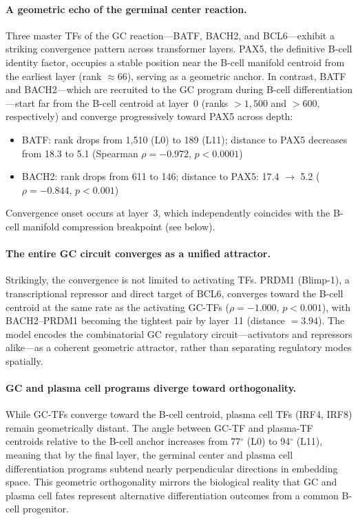 \documentclass[10pt,twocolumn]{article}
\begin{document}
\paragraph{A geometric echo of the germinal center reaction.}
Three master TFs of the GC reaction---BATF, BACH2, and BCL6---exhibit a striking convergence pattern across transformer layers.
PAX5, the definitive B-cell identity factor, occupies a stable position near the B-cell manifold centroid from the earliest layer (rank $\approx 66$), serving as a geometric anchor.
In contrast, BATF and BACH2---which are recruited to the GC program during B-cell differentiation---start far from the B-cell centroid at layer~0 (ranks $> 1{,}500$ and $> 600$, respectively) and converge progressively toward PAX5 across depth:
\begin{itemize}
  \item BATF: rank drops from 1{,}510 (L0) to 189 (L11); distance to PAX5 decreases from 18.3 to 5.1 (Spearman $\rho = -0.972$, $p < 0.0001$)
  \item BACH2: rank drops from 611 to 146; distance to PAX5: 17.4 $\to$ 5.2 ($\rho = -0.844$, $p < 0.001$)
\end{itemize}
Convergence onset occurs at layer~3, which independently coincides with the B-cell manifold compression breakpoint (see below).

\paragraph{The entire GC circuit converges as a unified attractor.}
Strikingly, the convergence is not limited to activating TFs.
PRDM1 (Blimp-1), a transcriptional repressor and direct target of BCL6, converges toward the B-cell centroid at the same rate as the activating GC-TFs ($\rho = -1.000$, $p < 0.001$), with BACH2--PRDM1 becoming the tightest pair by layer~11 (distance $= 3.94$).
The model encodes the combinatorial GC regulatory circuit---activators and repressors alike---as a coherent geometric attractor, rather than separating regulatory modes spatially.

\paragraph{GC and plasma cell programs diverge toward orthogonality.}
While GC-TFs converge toward the B-cell centroid, plasma cell TFs (IRF4, IRF8) remain geometrically distant.
The angle between GC-TF and plasma-TF centroids relative to the B-cell anchor increases from 77$^\circ$ (L0) to 94$^\circ$ (L11), meaning that by the final layer, the germinal center and plasma cell differentiation programs subtend nearly perpendicular directions in embedding space.
This geometric orthogonality mirrors the biological reality that GC and plasma cell fates represent alternative differentiation outcomes from a common B-cell progenitor.
\end{document}
